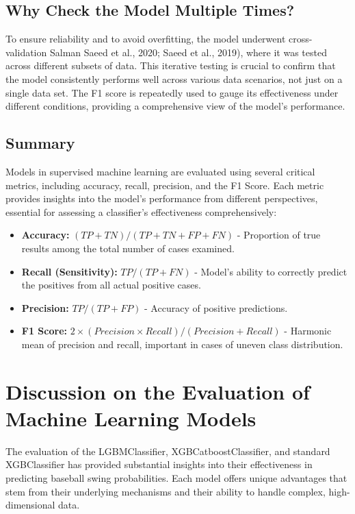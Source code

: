 \documentclass[12pt]{article}
\begin{document}
\subsection*{Why Check the Model Multiple Times?}
To ensure reliability and to avoid overfitting, the model underwent cross-validation Salman Saeed et al., 2020; Saeed et al., 2019), where it was tested across different subsets of data. This iterative testing is crucial to confirm that the model consistently performs well across various data scenarios, not just on a single data set. The F1 score is repeatedly used to gauge its effectiveness under different conditions, providing a comprehensive view of the model's performance.

\subsection*{Summary}
Models in supervised machine learning are evaluated using several critical metrics, including accuracy, recall, precision, and the F1 Score. Each metric provides insights into the model's performance from different perspectives, essential for assessing a classifier's effectiveness comprehensively:
\begin{itemize}
    \item \textbf{Accuracy:} \((TP + TN) / (TP + TN + FP + FN)\) - Proportion of true results among the total number of cases examined.
    \item \textbf{Recall (Sensitivity):} \(TP / (TP + FN)\) - Model's ability to correctly predict the positives from all actual positive cases.
    \item \textbf{Precision:} \(TP / (TP + FP)\) - Accuracy of positive predictions.
    \item \textbf{F1 Score:} \(2 \times (Precision \times Recall) / (Precision + Recall)\) - Harmonic mean of precision and recall, important in cases of uneven class distribution.
\end{itemize}

\maketitle

\section{Discussion on the Evaluation of Machine Learning Models}

The evaluation of the LGBMClassifier, XGBCatboostClassifier, and standard XGBClassifier has provided substantial insights into their effectiveness in predicting baseball swing probabilities. Each model offers unique advantages that stem from their underlying mechanisms and their ability to handle complex, high-dimensional data.
\end{document}
